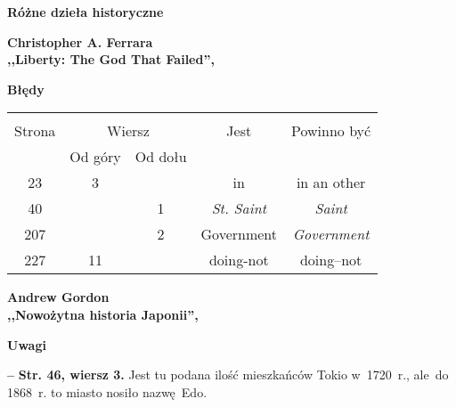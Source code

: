\documentclass[a4paper,11pt]{article}
\newcommand{\spaceTwo}{2em}
\newcommand{\spaceThree}{1em}
\newcommand{\spaceFour}{0.5em}
\newcommand{\tb}{\textbf}
\newcommand{\noi}{\noindent}
\newcommand{\start}{\noi \tb{--} {}}
\newcommand{\Center}[1]{\begin{center} #1 \end{center}}
\newcommand{\CenterTB}[1]{\Center{\tb{#1}}}
\newcommand{\StrWg}[2]{\tb{Str. #1, wiersz #2.}}
\newcommand{\Field}[1]{ \begin{center} {\LARGE \tb{#1} } \end{center} }
\newcommand{\Work}[1]{ \begin{center} {\large \tb{#1}} \end{center} }
\begin{document}
\vspace{\spaceTwo}





\newpage
\Field{Różne dzieła historyczne}

\vspace{\spaceTwo} \vspace{\spaceThree}



\Work{
  Christopher A. Ferrara \\
  ,,Liberty: The God That Failed'', \cite{Ferrara12} }


\CenterTB{Błędy}

\begin{center}
  \begin{tabular}{|c|c|c|c|c|}
    \hline
    & \multicolumn{2}{c|}{} & & \\
    Strona & \multicolumn{2}{c|}{Wiersz}& Jest & Powinno być \\ \cline{2-3}
    & Od góry & Od dołu &  &  \\ \hline
    23  & 3 & & in & in an other \\
    40  & & 1 & \emph{St. Saint} & \emph{Saint} \\
    207 & & 2 & Government & \emph{Government} \\
    227 & 11 & & doing-not & doing--not \\
    \hline
  \end{tabular}
\end{center}

\vspace{\spaceTwo}





\newpage

\Work{
  Andrew Gordon \\
  ,,Nowożytna historia Japonii'',
  \cite{GordonNowozytnaHistoriaJaponii10} }


\CenterTB{Uwagi}

\start \StrWg{46}{3} Jest tu podana ilość mieszkańców Tokio w~1720~r.,
ale~do 1868~r. to miasto nosiło nazwę~Edo.

\vspace{\spaceFour}
\end{document}
